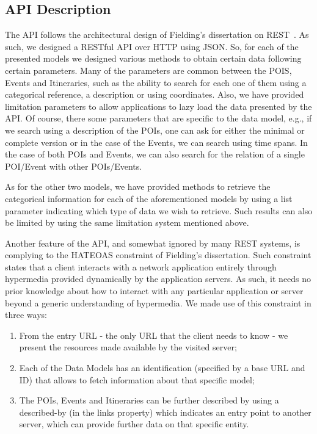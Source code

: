 \documentclass[times]{ettauth}
\begin{document}
\subsection{API Description}
\label{api-description}
The API follows the architectural design of Fielding's dissertation on \ac{REST}~\cite{fielding}. As such, we designed a RESTful API over HTTP using JSON. So, for each of the presented models we designed various methods to obtain certain data following certain parameters. Many of the parameters are common between the POIS, Events and Itineraries, such as the ability to search for each one of them using a categorical reference, a description or using coordinates. Also, we have provided limitation parameters to allow applications to lazy load the data presented by the API. Of course, there some parameters that are specific to the data model, e.g., if we search using a description of the POIs, one can ask for either the minimal or complete version or in the case of the Events, we can search using time spans. In the case of both POIs and Events, we can also search for the relation of a single POI/Event with other POIs/Events. 

As for the other two models, we have provided methods to retrieve the categorical information for each of the aforementioned models by using a list parameter indicating which type of data we wish to retrieve. Such results can also be limited by using the same limitation system mentioned above.

Another feature of the API, and somewhat ignored by many REST systems, is complying to the \acf{HATEOAS} constraint of Fielding's dissertation. Such constraint states that a client interacts with a network application entirely through hypermedia provided dynamically by the application servers. As such, it needs no prior knowledge about how to interact with any particular application or server beyond a generic understanding of hypermedia. We made use of this constraint in three ways:
\begin{enumerate}
\item From the entry URL - the only URL that the client needs to know - we present the resources made available by the visited server;
\item Each of the Data Models has an identification (specified by a base URL and ID) that allows to fetch information about that specific model;
\item The POIs, Events and Itineraries can be further described by using a described-by (in the links property) which indicates an entry point to another server, which can provide further data on that specific entity.
\end{enumerate}
\end{document}
